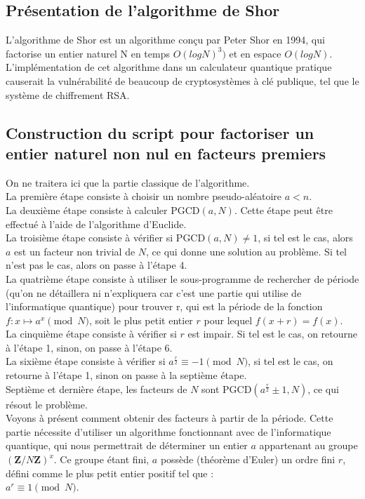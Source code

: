 \documentclass[12pt]{article}
\begin{document}
\subsection{Présentation de l'algorithme de Shor}
L'algorithme de Shor est un algorithme conçu par Peter Shor en 1994, qui factorise un entier naturel N en temps $O(log N)^3)$ et en espace $O(log N)$.
L'implémentation de cet algorithme dans un calculateur quantique pratique causerait la vulnérabilité de beaucoup de cryptosystèmes à clé publique, tel que le système de chiffrement RSA.

\subsection{Construction du script pour factoriser un entier naturel non nul en facteurs premiers}
On ne traitera ici que la partie classique de l'algorithme.
\\
La première étape consiste à choisir un nombre pseudo-aléatoire $a<n$.
\\
La deuxième étape consiste à calculer PGCD$(a, N)$. Cette étape peut être effectué à l'aide de l'algorithme d'Euclide.
\\
La troisième étape consiste à vérifier si PGCD$(a, N)\neq 1$, si tel est le cas, alors $a$ est un facteur non trivial de $N$, ce qui donne une solution au problème. Si tel n'est pas le cas, alors on passe à l'étape 4.
\\
La quatrième étape consiste à utiliser le sous-programme de rechercher de période (qu'on ne détaillera ni n'expliquera car c'est une partie qui utilise de l'informatique quantique) pour trouver r, qui est la période de la fonction $f:x \mapsto a^x \pmod N$, soit le plus petit entier $r$ pour lequel $f(x+r)=f(x)$.
\\
La cinquième étape consiste à vérifier si $r$ est impair. Si tel est le cas, on retourne à l'étape 1, sinon, on passe à l'étape 6.
\\
La sixième étape consiste à vérifier si $a^{\frac{r}{2}} \equiv -1 \pmod N$, si tel est le cas, on retourne à l'étape 1, sinon on passe à la septième étape.
\\
Septième et dernière étape, les facteurs de $N$ sont PGCD$(a^{\frac{r}{2}} \pm 1, N)$, ce qui résout le problème. 
\\
Voyons à présent comment obtenir des facteurs à partir de la période.
Cette partie nécessite d'utiliser un algorithme fonctionnant avec de l'informatique quantique, qui nous permettrait de déterminer un entier $a$ appartenant au groupe $(\textbf{Z}/N\textbf{Z})^x$. Ce groupe étant fini, $a$ possède (théorème d'Euler) un ordre fini $r$, défini comme le plus petit entier positif tel que : 
\\
$a^r \equiv 1 \pmod N$.
\end{document}
